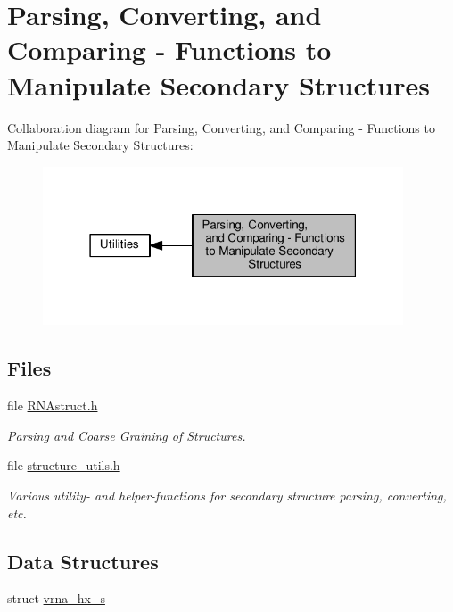 \hypertarget{group__struct__utils}{}\section{Parsing, Converting, and Comparing -\/ Functions to Manipulate Secondary Structures}
\label{group__struct__utils}
Collaboration diagram for Parsing, Converting, and Comparing -\/ Functions to Manipulate Secondary Structures\+:
\nopagebreak
\begin{figure}[H]
\begin{center}
\leavevmode
\includegraphics[width=303pt]{group__struct__utils}
\end{center}
\end{figure}
\subsection*{Files}
\begin{DoxyCompactItemize}
\item 
file \hyperlink{RNAstruct_8h}{R\+N\+Astruct.\+h}
\begin{DoxyCompactList}\small\item\em Parsing and Coarse Graining of Structures. \end{DoxyCompactList}\item 
file \hyperlink{structure__utils_8h}{structure\+\_\+utils.\+h}
\begin{DoxyCompactList}\small\item\em Various utility-\/ and helper-\/functions for secondary structure parsing, converting, etc. \end{DoxyCompactList}\end{DoxyCompactItemize}
\subsection*{Data Structures}
\begin{DoxyCompactItemize}
\item 
struct \hyperlink{group__struct__utils_structvrna__hx__s}{vrna\+\_\+hx\+\_\+s}
\end{DoxyCompactItemize}
